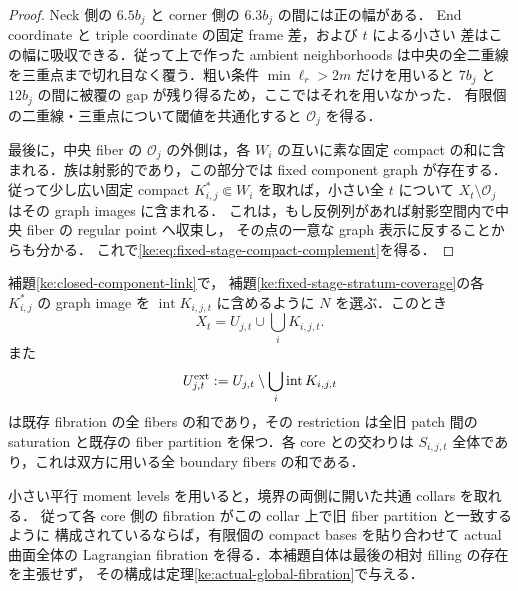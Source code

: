 \begin{proof}
Neck 側の $6.5b_j$ と corner 側の $6.3b_j$ の間には正の幅がある．
End coordinate と triple coordinate の固定 frame 差，および $t$ による小さい
差はこの幅に吸収できる．従って上で作った ambient neighborhoods は中央の全二重線
を三重点まで切れ目なく覆う．粗い条件 $\min\ell_r>2m$ だけを用いると
$7b_j$ と $12b_j$ の間に被覆の gap が残り得るため，ここではそれを用いなかった．
有限個の二重線・三重点について閾値を共通化すると $\mathcal O_j$ を得る．

最後に，中央 fiber の $\mathcal O_j$ の外側は，各 $W_i$ の互いに素な固定 compact
の和に含まれる．族は射影的であり，この部分では fixed component graph が存在する．
従って少し広い固定 compact $K^*_{i,j}\Subset W_i$ を取れば，小さい全 $t$ について
$X_t\setminus\mathcal O_j$ はその graph images に含まれる．
これは，もし反例列があれば射影空間内で中央 fiber の regular point へ収束し，
その点の一意な graph 表示に反することからも分かる．
これで\eqref{ke:eq:fixed-stage-compact-complement}を得る．
\end{proof}

\begin{lemma}
\label{ke:whole-fiber-core-trim}
補題\ref{ke:closed-component-link}で，
補題\ref{ke:fixed-stage-stratum-coverage}の各 $K^*_{i,j}$ の graph image を
$\operatorname{int}K_{i,j,t}$ に含めるように $N$ を選ぶ．このとき
\[
 X_t=U_{j,t}\cup\bigcup_i K_{i,j,t}.
\]
また
\[
 U^{\rm ext}_{j,t}
 :=U_{j,t}\setminus\bigcup_i\operatorname{int}K_{i,j,t}
\]
は既存 fibration の全 fibers の和であり，その restriction は全旧 patch 間の
saturation と既存の fiber partition を保つ．各 core との交わりは $S_{i,j,t}$
全体であり，これは双方に用いる全 boundary fibers の和である．

小さい平行 moment levels を用いると，境界の両側に開いた共通 collars を取れる．
従って各 core 側の fibration がこの collar 上で旧 fiber partition と一致するように
構成されているならば，有限個の compact bases を貼り合わせて actual 曲面全体の
Lagrangian fibration を得る．本補題自体は最後の相対 filling の存在を主張せず，
その構成は定理\ref{ke:actual-global-fibration}で与える．
\end{lemma}


